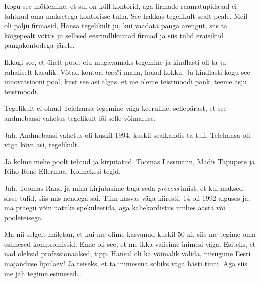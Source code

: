 
Kogu see mõtlemine, et sul on küll kontorid, aga firmade raamatupidajad ei tahtnud oma maksetega kontorisse tulla. See hakkas tegelikult sealt peale. Meil oli palju firmasid, Hansa tegelikult ju, kui vaadata panga  arengut, siis ta  kõigepealt võttis ju sellised eesrindlikumad firmad ja siis tulid eraisikud pangakontodega järele. 

Ikkagi see, et ühelt poolt elu mugavamaks tegemine ja kindlasti oli ta ju rahaliselt kasulik. Võtad kontori \emph{load}'i maha, hoiad kokku. Ja kindlasti kogu see innovatsiooni pool, kust see asi algas, et me oleme teistmoodi pank, teeme asju teistmoodi. 


Tegelikult ei olnud Telehansa tegemine väga keeruline, sellepärast, et see andmebaasi vahetus tegelikult lõi selle võimaluse. 


Jah. Andmebaasi vahetus oli  kuskil 1994, kuskil sealkandis ta tuli. Telehansa oli väga kõva asi, tegelikult.


Ja kolme mehe poolt tehtud ja kirjutatud. Toomas Lassmann, Madis Tapupere ja Riho-Rene Ellermaa. Kolmekesi tegid. 


Jah. Toomas Rand ja mina  kirjutasime taga seda \emph{process}'imist, et kui maksed sisse tulid, siis mis nendega sai. Tiim kasvas väga kiiresti. 14 oli 1992 alguses ja, ma praegu võin natuke spekuleerida, aga kahekordistus umbes aasta või pooleteisega. 


Ma nii selgelt mäletan, et kui me olime kasvanud kuskil 50-ni, siis me tegime oma esimesed kompromissid. Enne oli see, et me ikka valisime inimesi väga. Esiteks, et nad oleksid professionaalsed, tipp. Hansal oli ka võimalik valida, niisugune Eesti majanduse lipulaev! Ja teiseks, et ta inimesena sobiks väga hästi tiimi. Aga siis me jah tegime esimesed\ldots

